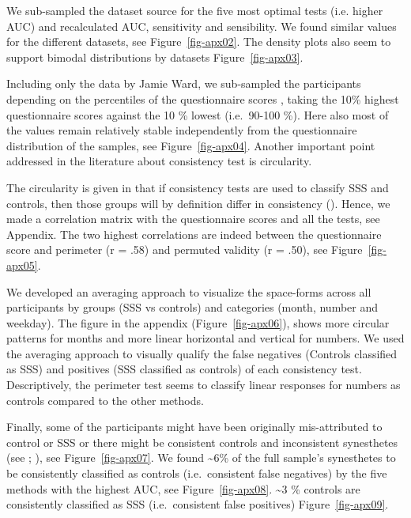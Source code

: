 \documentclass[
  man,
  floatsintext,
  longtable,
  a4paper,
  nolmodern,
  notxfonts,
  notimes,
  colorlinks=true,linkcolor=blue,citecolor=blue,urlcolor=blue]{apa7}
\begin{document}
We sub-sampled the dataset source for the five most optimal tests (i.e.
higher AUC) and recalculated AUC, sensitivity and sensibility. We found
similar values for the different datasets, see Figure~\ref{fig-apx02}.
The density plots also seem to support bimodal distributions by datasets
Figure~\ref{fig-apx03}.

Including only the data by Jamie Ward, we sub-sampled the participants
depending on the percentiles of the questionnaire scores , taking the
10\% highest questionnaire scores against the 10 \% lowest (i.e.~90-100
\%). Here also most of the values remain relatively stable independently
from the questionnaire distribution of the samples, see
Figure~\ref{fig-apx04}. Another important point addressed in the
literature about consistency test is circularity.

The circularity is given in that if consistency tests are used to
classify SSS and controls, then those groups will by definition differ
in consistency (). Hence, we
made a correlation matrix with the questionnaire scores and all the
tests, see Appendix. The two highest correlations are indeed between the
questionnaire score and perimeter (r = .58) and permuted validity (r =
.50), see Figure~\ref{fig-apx05}.

We developed an averaging approach to visualize the space-forms across
all participants by groups (SSS vs controls) and categories (month,
number and weekday). The figure in the appendix
(Figure~\ref{fig-apx06}), shows more circular patterns for months and
more linear horizontal and vertical for numbers. We used the averaging
approach to visually qualify the false negatives (Controls classified as
SSS) and positives (SSS classified as controls) of each consistency
test. Descriptively, the perimeter test seems to classify linear
responses for numbers as controls compared to the other methods.

Finally, some of the participants might have been originally
mis-attributed to control or SSS or there might be consistent controls
and inconsistent synesthetes (see ; ), see
Figure~\ref{fig-apx07}. We found \textasciitilde6\% of the full sample's
synesthetes to be consistently classified as controls (i.e.~consistent
false negatives) by the five methods with the highest AUC, see
Figure~\ref{fig-apx08}. \textasciitilde3 \% controls are consistently
classified as SSS (i.e.~consistent false positives)
Figure~\ref{fig-apx09}.
\end{document}
